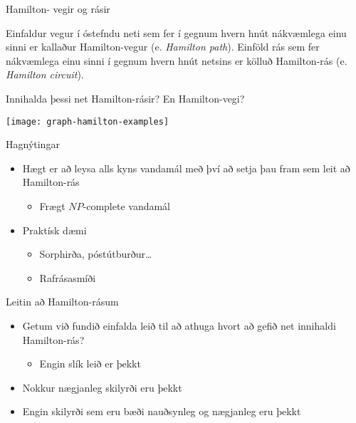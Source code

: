 \documentclass[handout]{beamer}
\begin{document}
\begin{frame}{Hamilton- vegir og rásir}
    \begin{tcolorbox}[title=Hamilton-vegir og rásir]
        Einfaldur vegur í óstefndu neti sem fer í gegnum hvern hnút nákvæmlega einu sinni er kallaður Hamilton-vegur (e. \emph{Hamilton path}). Einföld rás sem fer nákvæmlega einu sinni í gegnum hvern hnút netsins er kölluð Hamilton-rás (e. \emph{Hamilton circuit}).
    \end{tcolorbox}
    Innihalda þessi net Hamilton-rásir? En Hamilton-vegi?
    \begin{center}
        \texttt{[image: graph-hamilton-examples]}
    \end{center}
\end{frame}

\begin{frame}{Hagnýtingar}
    \begin{itemize}
        \item Hægt er að leysa alls kyns vandamál með því að setja þau fram sem leit að Hamilton-rás
        \begin{itemize}
            \item Frægt $NP$-complete vandamál
        \end{itemize}
        \item Praktísk dæmi
        \begin{itemize}
            \item Sorphirða, póstútburður\ldots
            \item Rafrásasmíði
        \end{itemize}
    \end{itemize}
\end{frame}

\begin{frame}{Leitin að Hamilton-rásum}
    \begin{itemize}
        \item Getum við fundið einfalda leið til að athuga hvort að gefið net innihaldi Hamilton-rás? \pause
        \begin{itemize}
            \item Engin slík leið er þekkt
        \end{itemize}
        \item Nokkur nægjanleg skilyrði eru þekkt
        \item Engin skilyrði sem eru bæði nauðsynleg og nægjanleg eru þekkt
    \end{itemize}
\end{frame}
\end{document}
